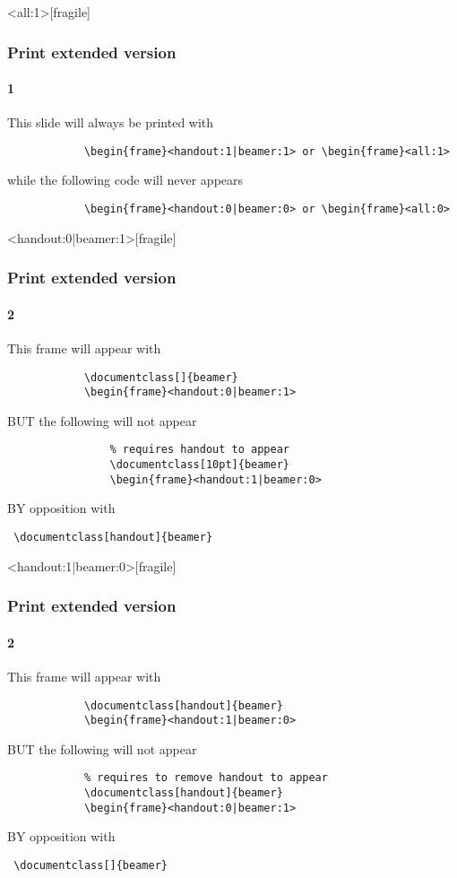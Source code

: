 	\begin{frame}<all:1>[fragile]
		\frametitle{Print extended version}
		\framesubtitle{1}
		
		This slide will always be printed with 
		\begin{verbatim}			
			\begin{frame}<handout:1|beamer:1> or \begin{frame}<all:1>
		\end{verbatim}
		
		while the following code will never appears
		\begin{verbatim}			
			\begin{frame}<handout:0|beamer:0> or \begin{frame}<all:0>	
		\end{verbatim}
	\end{frame}
	
	\begin{frame}<handout:0|beamer:1>[fragile]
		\frametitle{Print extended version}
		\framesubtitle{2}
		
		This frame will appear with
		\begin{verbatim}			
			\documentclass[]{beamer}
			\begin{frame}<handout:0|beamer:1>
		\end{verbatim}
		
		BUT the following will not appear
		\begin{verbatim}			
				% requires handout to appear
				\documentclass[10pt]{beamer} 
				\begin{frame}<handout:1|beamer:0>
		\end{verbatim}
		
		BY opposition with \begin{verbatim} \documentclass[handout]{beamer}
		\end{verbatim}
	\end{frame}
			
	\begin{frame}<handout:1|beamer:0>[fragile]
		\frametitle{Print extended version}
		\framesubtitle{2}
		
		This frame will appear with
		\begin{verbatim}			
			\documentclass[handout]{beamer}
			\begin{frame}<handout:1|beamer:0>
		\end{verbatim}
		
		BUT the following will not appear
		\begin{verbatim}			
		    % requires to remove handout to appear
			\documentclass[handout]{beamer} 
			\begin{frame}<handout:0|beamer:1>
		\end{verbatim}
		
		BY opposition with \begin{verbatim} \documentclass[]{beamer}
		\end{verbatim}
	\end{frame}
	